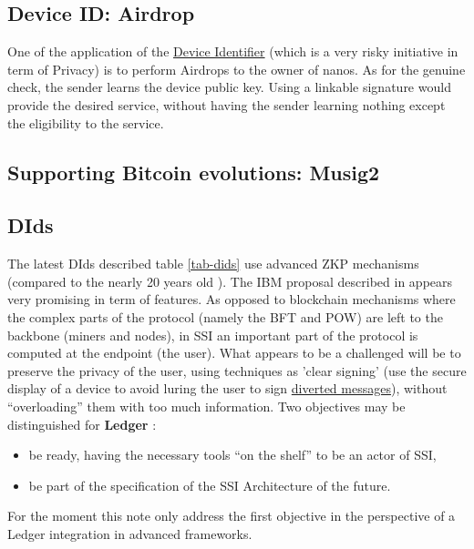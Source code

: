 \documentclass[11pt]{llncs2e/llncs}
\begin{document}
\subsection{Device ID: Airdrop} One of the application of the \href{https://ledgerhq.atlassian.net/wiki/spaces/TA/pages/3557261398/ARCH+DRAFT+Device+identification}{Device Identifier} (which is a very risky initiative in term of Privacy) is to perform Airdrops to the owner of nanos. As for the genuine check, the sender learns the device public key. Using a linkable signature \cite{RingCT} would provide the desired service, without having the sender learning nothing except the eligibility to the service.

\subsection{Supporting Bitcoin evolutions: Musig2}



\subsection{DIds}

 The latest DIds described table \ref{tab-dids} use advanced ZKP mechanisms (compared to the nearly 20 years old \cite{CL02}). The IBM proposal described in \cite{ElkhiyaouiCA21} appears very promising in term of features. As opposed to blockchain mechanisms where the complex parts of the protocol (namely the BFT and POW) are left to the backbone (miners and nodes), in SSI an important part of the protocol is computed at the endpoint (the user). What appears to be a challenged will be to preserve the privacy of the user, using techniques as 'clear signing' (use the secure display of a device to avoid luring the user to sign \href{https://www.ledger.com/academy/cryptos-greatest-weakness-blind-signing-explained}{diverted messages}), without ``overloading'' them with too much information.  
Two objectives may be distinguished for {\bf \textregistered Ledger} :
\begin{itemize}
 \item be ready, having the necessary tools ``on the shelf'' to be an actor of SSI,
 \item be part of the specification of the  SSI Architecture of the future.
\end{itemize}
For the moment this note only address the first objective in the perspective of a Ledger integration in advanced frameworks.
 
\end{document}
